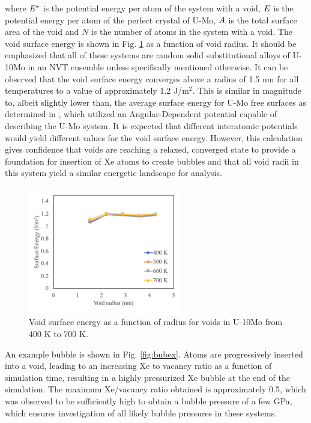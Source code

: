 \documentclass[review]{elsarticle}
\begin{document}
where $\it{E^{*}}$ is the potential energy per atom of the system with a void, $\it{E}$ is the potential energy per atom of the perfect crystal of U-Mo, $\it{A}$ is the total surface area of the void and $\textit{N}$ is the number of atoms in the system with a void. The void surface energy is shown in Fig. \ref{fig:voidE} as a function of void radius. It should be emphasized that all of these systems are random solid substitutional alloys of U-10Mo in an NVT ensemble unless specifically mentioned otherwise. It can be observed that the void surface energy converges above a radius of 1.5 nm for all temperatures to a value of approximately 1.2 J/m$^2$. This is similar in magnitude to, albeit slightly lower than, the average surface energy for U-Mo free surfaces as determined in \cite{beelerumo}, which utilized an Angular-Dependent potential \cite{smirnovaADP} capable of describing the U-Mo system. It is expected that different interatomic potentials would yield different values for the void surface energy. However, this calculation gives confidence that voids are reaching a relaxed, converged state to provide a foundation for insertion of Xe atoms to create bubbles and that all void radii in this system yield a similar energetic landscape for analysis.

\begin{figure}[h]
 \centering
 \includegraphics[width=0.6\textwidth]{1_void_Esurf.png} 
 \caption{Void surface energy as a function of radius for voids in U-10Mo from 400 K to 700 K.}
 \label{fig:voidE}
\end{figure}

An example bubble is shown in Fig. \ref{fig:bubex}. Atoms are progressively inserted into a void, leading to an increasing Xe to vacancy ratio as a function of simulation time, resulting in a highly pressurized Xe bubble at the end of the simulation. The maximum Xe/vacancy ratio obtained is approximately 0.5, which was observed to be sufficiently high to obtain a bubble pressure of a few GPa, which ensures investigation of all likely bubble pressures in these systems. 
\end{document}
